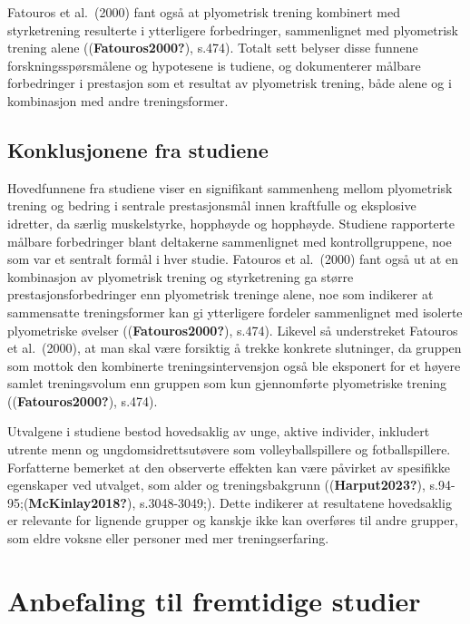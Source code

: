 \documentclass[
  letterpaper,
  DIV=11,
  numbers=noendperiod]{scrreprt}
\begin{document}
Fatouros et al.~(2000) fant også at plyometrisk trening kombinert med
styrketrening resulterte i ytterligere forbedringer, sammenlignet med
plyometrisk trening alene ((\textbf{Fatouros2000?}), s.474). Totalt sett
belyser disse funnene forskningsspørsmålene og hypotesene is tudiene, og
dokumenterer målbare forbedringer i prestasjon som et resultat av
plyometrisk trening, både alene og i kombinasjon med andre
treningsformer.

\section{Konklusjonene fra studiene}\label{konklusjonene-fra-studiene}

Hovedfunnene fra studiene viser en signifikant sammenheng mellom
plyometrisk trening og bedring i sentrale prestasjonsmål innen
kraftfulle og eksplosive idretter, da særlig muskelstyrke, hopphøyde og
hopphøyde. Studiene rapporterte målbare forbedringer blant deltakerne
sammenlignet med kontrollgruppene, noe som var et sentralt formål i hver
studie. Fatouros et al.~(2000) fant også ut at en kombinasjon av
plyometrisk trening og styrketrening ga større prestasjonsforbedringer
enn plyometrisk treninge alene, noe som indikerer at sammensatte
treningsformer kan gi ytterligere fordeler sammenlignet med isolerte
plyometriske øvelser ((\textbf{Fatouros2000?}), s.474). Likevel så
understreket Fatouros et al.~(2000), at man skal være forsiktig å trekke
konkrete slutninger, da gruppen som mottok den kombinerte
treningsintervensjon også ble eksponert for et høyere samlet
treningsvolum enn gruppen som kun gjennomførte plyometriske trening
((\textbf{Fatouros2000?}), s.474).

Utvalgene i studiene bestod hovedsaklig av unge, aktive individer,
inkludert utrente menn og ungdomsidrettsutøvere som volleyballspillere
og fotballspillere. Forfatterne bemerket at den observerte effekten kan
være påvirket av spesifikke egenskaper ved utvalget, som alder og
treningsbakgrunn ((\textbf{Harput2023?}),
s.94-95;(\textbf{McKinlay2018?}), s.3048-3049;). Dette indikerer at
resultatene hovedsaklig er relevante for lignende grupper og kanskje
ikke kan overføres til andre grupper, som eldre voksne eller personer
med mer treningserfaring.


\chapter{Anbefaling til fremtidige
studier}\label{anbefaling-til-fremtidige-studier}
\end{document}
